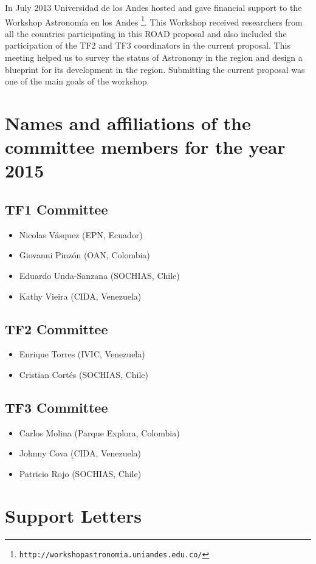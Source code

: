 \documentclass[12pt]{article}
\begin{document}
In July 2013 Universidad de los Andes hosted and gave financial
support to the Workshop Astronomía en los
Andes \footnote{\texttt{http://workshopastronomia.uniandes.edu.co/}}. This
Workshop received researchers from all the countries participating in
this ROAD proposal and also included the participation of the TF2 and
TF3 coordinators in the current proposal. This meeting helped us to
survey the status of Astronomy in the region and design a blueprint
for its development in the region. Submitting the current proposal was
one of the main goals of the workshop. 
 
\newpage



\section{Names and affiliations of the committee members for the year 2015}

\subsection*{TF1 Committee}
\begin{itemize}
\item Nicolas V\'asquez (EPN, Ecuador)
\item Giovanni Pinz\'on (OAN, Colombia)
\item Eduardo Unda-Sanzana (SOCHIAS, Chile)
\item Kathy Vieira (CIDA, Venezuela)
\end{itemize}

\subsection*{TF2 Committee}
\begin{itemize}
\item Enrique Torres  (IVIC, Venezuela)
\item Cristian Cort\'es (SOCHIAS, Chile)
\end{itemize}

\subsection*{TF3 Committee}
\begin{itemize}
\item Carlos Molina (Parque Explora, Colombia)
\item Johnny Cova (CIDA, Venezuela)
\item Patricio Rojo (SOCHIAS, Chile)
\end{itemize}

\newpage
\section{Support Letters}
\end{document}

